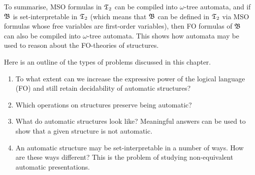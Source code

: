 % 


% 
% 
% 
% 
% 
% 
% 

To summarise, MSO formulas in $\mathfrak{T}_2$ can be compiled into $\omega$-tree 
automata, and if $\mathfrak{B}$ is set-interpretable in $\mathfrak{T}_2$ (which means that 
$\mathfrak{B}$ can be defined in $\mathfrak{T}_2$ via MSO formulas whose free variables are first-order variables),
then FO formulas of $\mathfrak{B}$ can also be compiled into $\omega$-tree automata. This shows how automata may be used
to reason about the FO-theories of structures.

Here is an outline of the types of problems discussed in this chapter. 

\begin{enumerate}
\item To what extent can we increase the expressive power of the logical language (FO) and still retain decidability of automatic structures? 
\item Which operations on structures preserve being automatic?
\item What do automatic structures look like? Meaningful answers can be used to show that a given structure is not automatic.
\item An automatic structure may be set-interpretable in a number of ways. How are these ways different?
This is the problem of studying non-equivalent automatic presentations.
\end{enumerate}

